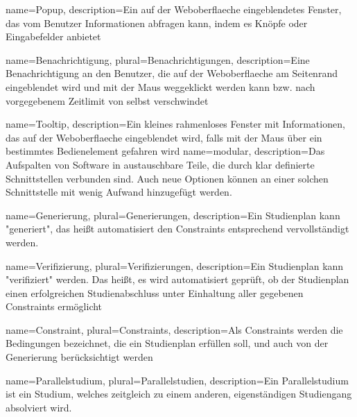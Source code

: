 {
	name=Popup,
	description={Ein auf der \gls{Weboberflaeche} eingeblendetes Fenster, das vom \gls{Benutzer} Informationen abfragen kann, indem es Knöpfe oder Eingabefelder anbietet}
}

{
	name=Benachrichtigung,
	plural=Benachrichtigungen,
	description={Eine Benachrichtigung an den \gls{Benutzer}, die auf der \gls{Weboberflaeche} am Seitenrand eingeblendet wird und mit der Maus weggeklickt werden kann bzw. nach vorgegebenem Zeitlimit von selbst verschwindet}
}

{
	name=Tooltip,
	description={Ein kleines rahmenloses Fenster mit Informationen, das auf der \gls{Weboberflaeche} eingeblendet wird, falls mit der Maus über ein bestimmtes Bedienelement gefahren wird}
}
{
	name=modular,
	description={Das Aufspalten von Software in austauschbare Teile, die durch klar definierte Schnittstellen verbunden sind. Auch neue Optionen können an einer solchen Schnittstelle mit wenig Aufwand hinzugefügt werden.}
}
	
{
	name=Generierung,
	plural=Generierungen,
	description={Ein \gls{Studienplan} kann "generiert", das heißt automatisiert den \glspl{Constraint} entsprechend vervollständigt werden.}
}

{
name=Verifizierung,
plural=Verifizierungen,
description={Ein \gls{Studienplan} kann "verifiziert" werden. Das heißt, es wird automatisiert geprüft, ob der Studienplan einen erfolgreichen Studienabschluss unter Einhaltung aller gegebenen \glspl{Constraint} ermöglicht}
}

{
name=Constraint,
plural=Constraints,
description={Als Constraints werden die Bedingungen bezeichnet, die ein \gls{Studienplan} erfüllen soll, und auch von der \gls{Generierung} berücksichtigt werden}
}

{
name=Parallelstudium,
plural=Parallelstudien,
description={Ein Parallelstudium ist ein Studium, welches zeitgleich zu einem anderen, eigenständigen Studiengang absolviert wird.}
}